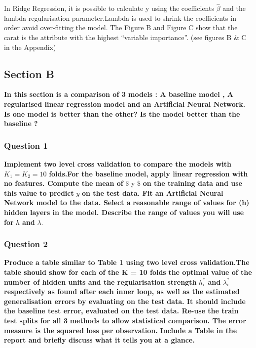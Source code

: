 \documentclass[
]{article}
\begin{document}
In Ridge Regression, it is possible to calculate y using the
coefficients \(\hat{\beta}\) and the lambda regularisation
parameter.Lambda is used to shrink the coefficients in order avoid
over-fitting the model. The Figure B and Figure C show that the carat is
the attribute with the highest ``variable importance''. (see figures B
\& C in the Appendix)

\hypertarget{section-b}{%
\subsection{Section B}\label{section-b}}

\textbf{In this section is a comparison of 3 models : A baseline model ,
A regularised linear} \textbf{regression model and an Artificial Neural
Network.} \textbf{Is one model is better than the other? Is the model
better than the baseline ?}

\hypertarget{question-1-1}{%
\subsubsection{Question 1}\label{question-1-1}}

\textbf{Implement two level cross validation to compare the models with}
\(K_{1} = K_{2} = 10\) \textbf{folds.For the baseline} \textbf{model,
apply linear regression with no features. Compute the mean of }\$ y \$
\textbf{on the training data and use this} \textbf{value to predict}
\(y\) \textbf{on the test data. Fit an Artificial Neural Network model
to the data. Select a} \textbf{reasonable range of values for (h) hidden
layers in the model. Describe the range of values you will use}
\textbf{for }\(h\) \textbf{and }\(\lambda\).

\hypertarget{question-2-1}{%
\subsubsection{Question 2}\label{question-2-1}}

\textbf{Produce a table similar to Table 1 using two level cross
validation.The table should show for each of the K = 10 folds}
\textbf{the optimal value of the number of hidden units and the
regularisation strength} \(h_{i}^*%
\) \textbf{and} \(\lambda_{i}^*\) \textbf{respectively as found after
each inner loop, as well as the estimated generalisation errors by
evaluating on the test} \textbf{data. It should include the baseline
test error, evaluated on the test data. Re-use the train test splits for
all 3} \textbf{methods to allow statistical comparison. The error
measure is the squared loss per observation.} \textbf{Include a Table in
the report and briefly discuss what it tells you at a glance.}
\end{document}
